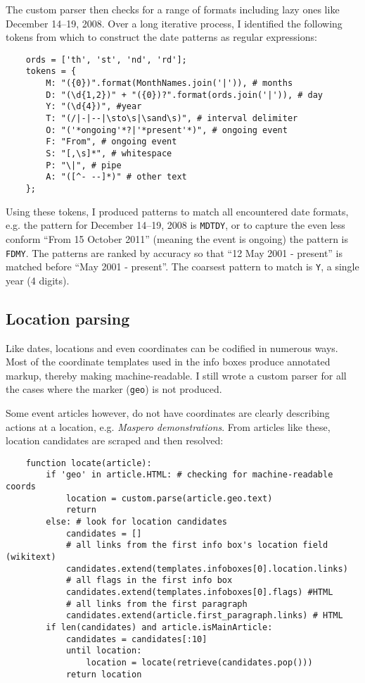 The custom parser then checks for a range of formats including lazy ones like December 14--19, 2008.
Over a long iterative process, I identified the following tokens from which to construct the date patterns as regular expressions:

\begin{lstlisting}
	ords = ['th', 'st', 'nd', 'rd'];
	tokens = {
		M: "({0})".format(MonthNames.join('|')), # months
		D: "(\d{1,2})" + "({0})?".format(ords.join('|')), # day
		Y: "(\d{4})", #year
		T: "(/|-|--|\sto\s|\sand\s)", # interval delimiter
		O: "('*ongoing'*?|'*present'*)", # ongoing event
		F: "From", # ongoing event
		S: "[,\s]*", # whitespace
		P: "\|", # pipe
		A: "([^- --]*)" # other text
	};
\end{lstlisting}

Using these tokens, I produced patterns to match all encountered date formats, e.g. the pattern for December 14--19, 2008 is \verb"MDTDY", or to capture the even less conform ``From 15 October 2011'' (meaning the event is ongoing) the pattern is \verb"FDMY".
The patterns are ranked by accuracy so that ``12 May 2001 - present'' is matched before ``May 2001 - present''.
The coarsest pattern to match is \verb"Y", a single year (4 digits).


\subsection{Location parsing}

Like dates, locations and even coordinates can be codified in numerous ways. 
Most of the coordinate templates used in the info boxes produce annotated markup, thereby making machine-readable.
I still wrote a custom parser for all the cases where the marker (\verb"geo") is not produced.

Some event articles however, do not have coordinates are clearly describing actions at a location, e.g. \emph{Maspero demonstrations}.
From articles like these, location candidates are scraped and then resolved:

\begin{lstlisting}
	function locate(article):
		if 'geo' in article.HTML: # checking for machine-readable coords
			location = custom.parse(article.geo.text)
			return
		else: # look for location candidates
			candidates = []
			# all links from the first info box's location field (wikitext)
			candidates.extend(templates.infoboxes[0].location.links)
			# all flags in the first info box 
			candidates.extend(templates.infoboxes[0].flags) #HTML
			# all links from the first paragraph
			candidates.extend(article.first_paragraph.links) # HTML
		if len(candidates) and article.isMainArticle:
			candidates = candidates[:10]
			until location:
				location = locate(retrieve(candidates.pop()))
			return location
\end{lstlisting}


